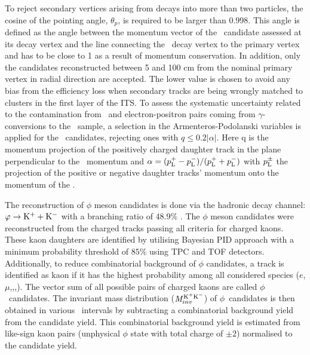 To reject secondary vertices arising from decays into more than two particles, the cosine of the pointing angle, $\theta_{p}$, is required to be larger than 0.998. This angle is defined as the angle between the momentum vector of the \vo~candidate assessed at its decay vertex and the line connecting the \vo~decay vertex to the primary vertex and has to be close to 1 as a result of momentum conservation. In addition, only the candidates reconstructed between 5 and 100 cm from the nominal primary vertex in radial direction are accepted. The lower value is chosen to avoid any bias from the efficiency loss when secondary tracks are being wrongly matched to clusters in the first layer of the ITS. To assess the systematic uncertainty related to the contamination from \lambdas~and electron-positron pairs coming from $\gamma$-conversions to the \Ks~sample, a selection in the Armenteros-Podolanski variables \cite{doi:10.1080/14786440108520416} is applied for the \Ks~candidates, rejecting ones with $q\le 0.2|\alpha|$. Here q is the momentum projection of the positively charged daughter track in the plane perpendicular to the \vo~momentum and $\alpha = (p_{\rm{L}}^{+} - p_{\rm{L}}^{-})/(p_{\rm{L}}^{+} + p_{\rm{L}}^{-})$ with $p_{\rm{L}}^{\pm}$ the projection of the positive or negative daughter tracks' momentum onto the momentum of the
\vo.


The reconstruction of $\phi$ meson candidates is done via the hadronic decay channel: $\varphi \rightarrow {\rm K}^{+} + {\rm K}^{-}$ with a branching ratio of 48.9\% \cite{Olive_2016}. The $\phi$ meson candidates were reconstructed from the charged tracks passing all criteria for charged kaons. These kaon daughters are identified by utilising Bayesian PID approach \cite{Adam:2016acv} with a minimum probability threshold of $85\%$ using TPC and TOF detectors. Additionally, to reduce combinatorial background of $\phi$ candidates, a track is identified as kaon if it has the highest probability among all considered species ($e$,$\mu$,\pion,\kaon,\proton). The vector sum of all possible pairs of charged kaons are called $\phi$~candidates. The invariant mass distribution (${\it M}_{inv}^{\rm K^{+}K^{-}}$) of $\phi$~candidates is then obtained in various \pT~intervals by subtracting a combinatorial background yield from the candidate yield. This combinatorial background yield is estimated from like-sign kaon pairs (unphysical $\phi$ state with total charge of $\pm2$) normalised to the candidate yield. 



